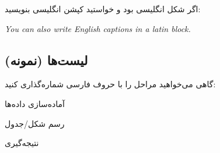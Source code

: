 اگر شکل انگلیسی بود و خواستید کپشن انگلیسی بنویسید:
\begin{latin}
	\textit{You can also write English captions in a latin block.}
\end{latin}

\subsection{لیست‌ها (نمونه)}
گاهی می‌خواهید مراحل را با حروف فارسی شماره‌گذاری کنید:
\begin{الفبا}
\item آماده‌سازی داده‌ها
\item رسم شکل/جدول
\item نتیجه‌گیری
\end{الفبا}

